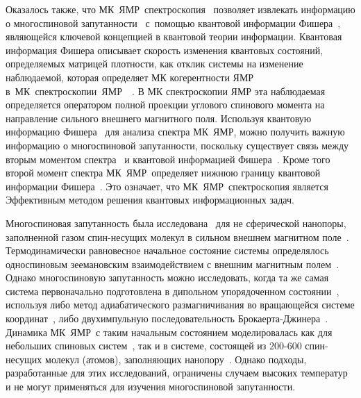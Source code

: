 \documentclass[utf8]{jetp}
\begin{document}
Оказалось также, что МК~ЯМР~спектроскопия~\cite{Baum_1985} позволяет извлекать информацию о многоспиновой запутанности~\cite{G_rttner_2018} с~помощью квантовой информации Фишера~\cite{T_th_2014, Pezz__2018},
являющейся ключевой концепцией в квантовой теории информации.
Квантовая информация Фишера описывает скорость изменения квантовых состояний,
определяемых матрицей плотности, как отклик системы на изменение наблюдаемой,
которая определяет МК когерентности ЯМР в~МК~спектроскопии~ЯМР~~\cite{Baum_1985}.
В МК спектроскопии ЯМР эта наблюдаемая определяется оператором полной проекции углового спинового момента на направление сильного внешнего магнитного поля.
Используя квантовую информацию Фишера~\cite{Liu_2014} для анализа спектра МК~ЯМР,
можно получить важную информацию о многоспиновой запутанности,
поскольку существует связь между вторым моментом спектра~\cite{Khitrin_1997} и квантовой информацией Фишера~\cite{G_rttner_2018,Doronin_2019}.
Кроме того второй момент спектра МК~ЯМР~определяет нижнюю границу квантовой информации Фишера~\cite{G_rttner_2018}.
Это означает, что МК~ЯМР~спектроскопия является Эффективным методом решения квантовых информационных задач.

Многоспиновая запутанность была исследована~\cite{Doronin_2019} для не сферической нанопоры,
заполненной газом  спин-несущих молекул в сильном внешнем магнитном поле~\cite{Baugh_2001,Doronin_2009}.
Термодинамически равновесное начальное состояние системы определялось односпиновым зеемановским взаимодействием с внешним магнитным полем~\cite{Doronin_2007a}.
Однако  многоспиновую запутанность можно  исследовать,
когда та же самая система первоначально подготовлена в дипольном упорядоченном состоянии~\cite{Goldman_1970},
используя либо метод адиабатического размагничивания во вращающейся системе координат~\cite{Goldman_1970, Slichter_1961},
либо двухимпульную последовательность Брокаерта-Джинера~\cite{Goldman_1970, Jeener_1967}.
Динамика МК~ЯМР~с таким начальным состоянием моделировалась как для небольших спиновых систем~\cite{Doronin_2007a, Doronin_2007b},
так и в системе, состоящей из 200-600 спин-несущих молекул (атомов), заполняющих нанопору~\cite{Doronin_2011}.
Однако подходы, разработанные для этих исследований, ограничены случаем высоких температур и не могут применяться  для изучения многоспиновой запутанности.
\end{document}
